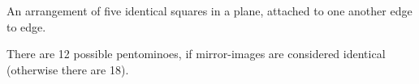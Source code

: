 An arrangement of five identical squares in a plane, 
attached to one another edge to edge.
\par
There are 12 possible pentominoes, if mirror-images are
considered identical (otherwise there are 18).
